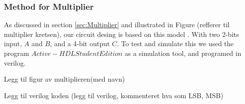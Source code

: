 \subsubsection{Method for Multiplier} \label{Method-Multiplier}
As discussed in section \ref{sec:Multiplier} and illustrated in Figure (refferer til multiplier kretsen), our circuit desing is based on this model . With two 2-bits input, $A$ and $B$, and a 4-bit output $C$. To test and simulate this we used the program $Active-HDL Student Edition$ as a simulation tool, and programed in verilog. 

Legg til figur av multiplieren(med navn)

Legg til verilog koden (legg til verilog, kommenteret hva som LSB, MSB)
